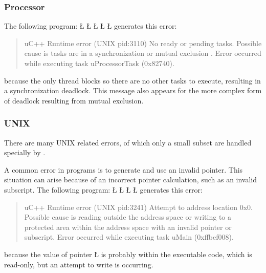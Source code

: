 \documentclass[openright,twoside]{report}
\begin{document}
\subsubsection{Processor}

The following program:
\LGinlinefalse\LGbegin\lgrinde
\L{}
\L{}
\L{\LB{}}
\L{\LB{}}
\CE{}\L{\LB{\}}}
\endlgrinde\LGend
generates this error:
\begin{quote}
\BGfont
uC++ Runtime error (UNIX pid:3110) No ready or pending tasks.
Possible cause is tasks are in a synchronization or mutual exclusion .
Error occurred while executing task uProcessorTask (0x82740).
\end{quote}
because the only thread blocks so there are no other tasks to execute, resulting in a synchronization deadlock.
This message also appears for the more complex form of deadlock resulting from mutual exclusion.


\subsubsection{UNIX}

There are many UNIX related errors, of which only a small subset are handled specially by \uC.

A common error in \CC programs is to generate and use an invalid pointer.
This situation can arise because of an incorrect pointer calculation, such as an invalid subscript.
The following program:
\LGinlinefalse\LGbegin\lgrinde
\L{}
\L{\LB{}}
\CE{}\L{\LB{}}
\CE{}\L{\LB{\}}}
\endlgrinde\LGend
generates this error:
\begin{quote}
\BGfont
uC++ Runtime error (UNIX pid:3241) Attempt to address location 0x0.
Possible cause is reading outside the address space or writing to a protected area within the address space with an invalid pointer or subscript.
Error occurred while executing task uMain (0xffbef008).
\end{quote}
because the value of pointer \LGinlinetrue\LGbegin\lgrinde\L{}\endlgrinde\LGend{} is probably within the executable code, which is read-only, but an attempt to write is occurring.
\end{document}
